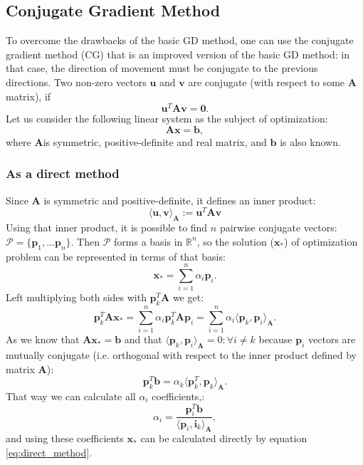 \subsection{Conjugate Gradient Method}
To overcome the drawbacks of the basic GD method, one can use the conjugate gradient method (CG) that is an improved version of the basic GD method: in that case, the direction of movement must be conjugate to the previous directions. Two non-zero vectors $\mathbf{u}$ and $\mathbf{v}$ are conjugate (with respect to some $\mathbf{A}$ matrix), if $$\mathbf{u}^T\mathbf{Av} = \mathbf{0}.$$
Let us consider the following linear system as the subject of optimization:
$$\mathbf{Ax} = \mathbf{b},$$
where $\mathbf{A} $is symmetric, positive-definite and real matrix, and $\mathbf{b}$ is also known.

\subsubsection{As a direct method} Since $\mathbf{A}$ is symmetric and positive-definite, it defines an inner product:
$$\langle \mathbf{u}, \mathbf{v} \rangle_\mathbf{A} := \mathbf{u}^T\mathbf{Av}$$
Using that inner product, it is possible to find $n$ pairwise conjugate vectors: $\mathcal{P} = \{\mathbf{p}_1,...\mathbf{p}_n\}$. Then $\mathcal{P}$ forms a basis in $\mathbb{R}^n$, so the solution ($\mathbf{x_*}$) of optimization problem can be represented in terms of that basis:
\begin{equation} \label{eq:direct_method}
    \mathbf{x_*} = \sum_{i=1}^{n} \alpha_i \mathbf{p}_i.
\end{equation}
Left multiplying both sides with $\mathbf{p}_k^T \mathbf{A}$ we get:
$$\mathbf{p}_k^T\mathbf{Ax_*} = \sum_{i=1}^{n} \alpha_i \mathbf{p}_k^T \mathbf{A} \mathbf{p}_i = \sum_{i=1}^{n} \alpha_i \langle \mathbf{p}_k, \mathbf{p}_i \rangle_\mathbf{A}.$$
As we know that $\mathbf{Ax_*} = \mathbf{b}$ and that $\langle \mathbf{p}_k, \mathbf{p}_i \rangle_\mathbf{A} = 0 : \forall i \ne k $  because $\mathbf{p}_i$ vectors are mutually conjugate (i.e. orthogonal with respect to the inner product defined by matrix $\mathbf{A}$):
$$\mathbf{p}_k^T\mathbf{b} = \alpha_k \langle \mathbf{p}_k^T, \mathbf{p}_k \rangle_\mathbf{A}.$$
That way we can calculate all $\alpha_i$ coefficients,:
$$\alpha_i = \frac{\mathbf{p}_i^T\mathbf{b}}{\langle \mathbf{p}_i, \mathbf{i}_k \rangle_\mathbf{A}},$$
and using these coefficients $\mathbf{x_*}$ can be calculated directly by equation \ref{eq:direct_method}.


